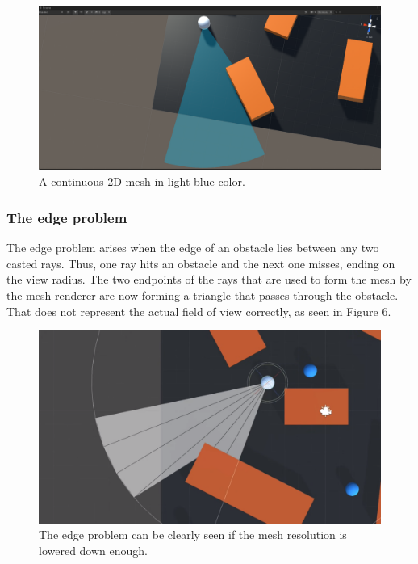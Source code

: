 \documentclass{article}
\begin{document}
\begin{figure} %
	\centering
	\includegraphics[width=1\columnwidth]{FOV(6).png} %
	\caption{A continuous 2D mesh in light blue color.}
\end{figure}

\subsubsection{The edge problem}

The edge problem arises when the edge of an obstacle lies between any two casted rays. Thus, one ray hits an obstacle and the next one misses, ending on the view radius. The two endpoints of the rays that are used to form the mesh by the mesh renderer are now forming a triangle that passes through the obstacle. That does not represent the actual field of view correctly, as seen in Figure 6. 

\begin{figure} %
	\centering
	\includegraphics[width=1\columnwidth]{FOV(7).png} %
	\caption{The edge problem can be clearly seen if the mesh resolution is lowered down enough.}
\end{figure}
\end{document}
